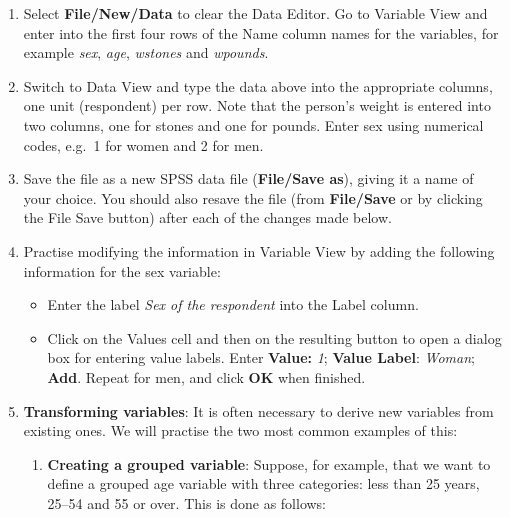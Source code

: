\documentclass[11pt,a4paper,openany]{book}
\begin{document}
\begin{enumerate}
\def\labelenumi{\arabic{enumi}.}
\item
  Select \textbf{File/New/Data} to clear the Data Editor. Go to Variable
  View and enter into the first four rows of the Name column names for
  the variables, for example \emph{sex}, \emph{age}, \emph{wstones} and
  \emph{wpounds}.
\item
  Switch to Data View and type the data above into the appropriate
  columns, one unit (respondent) per row. Note that the person's weight
  is entered into two columns, one for stones and one for pounds. Enter
  sex using numerical codes, e.g.~1 for women and 2 for men.
\item
  Save the file as a new SPSS data file (\textbf{File/Save as}), giving
  it a name of your choice. You should also resave the file (from
  \textbf{File/Save} or by clicking the File Save button) after each of
  the changes made below.
\item
  Practise modifying the information in Variable View by adding the
  following information for the sex variable:

  \begin{itemize}
  \item
    Enter the label \emph{Sex of the respondent} into the Label column.
  \item
    Click on the Values cell and then on the resulting button to open a
    dialog box for entering value labels. Enter \textbf{Value:}
    \emph{1}; \textbf{Value Label}: \emph{Woman}; \textbf{Add}. Repeat
    for men, and click \textbf{OK} when finished.
  \end{itemize}
\item
  \textbf{Transforming variables}: It is often necessary to derive new
  variables from existing ones. We will practise the two most common
  examples of this:

  \begin{enumerate}
  \def\labelenumii{\arabic{enumii}.}
  \item
    \textbf{Creating a grouped variable}: Suppose, for example, that we
    want to define a grouped age variable with three categories: less
    than 25 years, 25--54 and 55 or over. This is done as follows:


\end{enumerate}
\end{enumerate}
\end{document}
